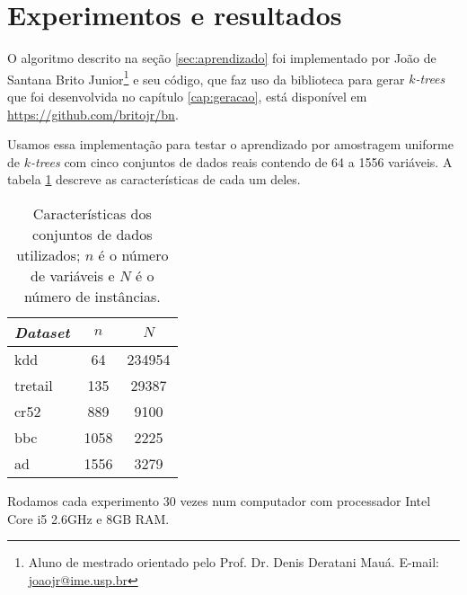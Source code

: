\section{Experimentos e resultados}

O algoritmo descrito na seção \ref{sec:aprendizado} foi implementado por João de Santana Brito Junior\footnote{Aluno de mestrado orientado pelo Prof. Dr. Denis Deratani Mauá. E-mail: \href{mailto:joaojr@ime.usp.br}{joaojr@ime.usp.br}} e seu código, que faz uso da biblioteca para gerar \emph{$k$-trees} que foi desenvolvida no capítulo \ref{cap:geracao}, está disponível em \url{https://github.com/britojr/bn}.

Usamos essa implementação para testar o aprendizado por amostragem uniforme de \emph{$k$-trees} com cinco conjuntos de dados reais contendo de 64 a 1556 variáveis. A tabela \ref{tab:conjuntos} descreve as características de cada um deles.

\begin{table}[h]
  \centering
  \begin{tabular}{l c c} \hline
    \emph{Dataset} & $n$ & $N$ \\ \hline
    kdd & 64 & 234954 \\
    tretail & 135 & 29387 \\
    cr52 & 889 & 9100 \\
    bbc & 1058 & 2225 \\
    ad & 1556 & 3279 \\ \hline
  \end{tabular}

  \caption{Características dos conjuntos de dados utilizados; $n$ é o número de variáveis e $N$ é o número de instâncias.}
  \label{tab:conjuntos}
\end{table}

Rodamos cada experimento 30 vezes num computador com processador Intel Core i5 2.6GHz e 8GB RAM.

%
%

